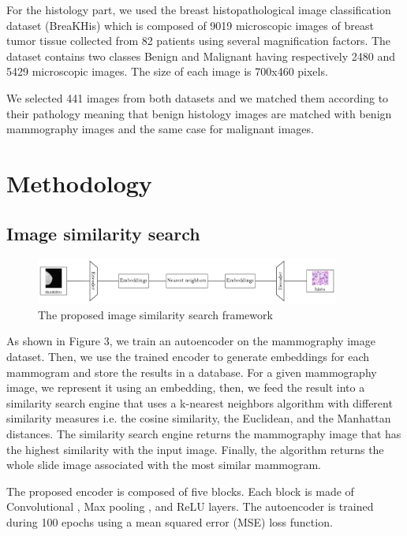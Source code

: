 \documentclass[11pt]{article}
\begin{document}
For the histology part, we used the breast histopathological image classification dataset (BreaKHis) \cite{spanhol2015dataset} which is composed of 9019 microscopic images of breast tumor tissue collected from 82 patients using several magnification factors. The dataset contains two classes Benign and Malignant having respectively 2480 and 5429 microscopic images. The size of each image is 700x460 pixels.

We selected 441 images from both datasets and we matched them according to their pathology meaning that benign histology images are matched with benign mammography images and the same case for malignant images. 
 \section{Methodology}
\subsection{Image similarity search}

\begin{figure}[h!]
  \centering
  \includegraphics[width=10cm]{similarity_search.pdf}

\caption{The proposed image similarity search framework}
\end{figure}



As shown in Figure 3, we train an autoencoder on the mammography image dataset. Then, we use the trained encoder to generate embeddings for each mammogram and store the results in a database. For a given mammography image, we represent it using an embedding, then, we feed the result into a similarity search engine that uses a k-nearest neighbors algorithm with different similarity measures i.e. the cosine similarity, the Euclidean, and the Manhattan distances. The similarity search engine returns the mammography image that has the highest similarity with the input image. Finally, the algorithm returns the whole slide image associated with the most similar mammogram.

The proposed encoder is composed of five blocks. Each block is made of Convolutional \cite{o2015introduction}, Max pooling \cite{graham2014fractional}, and ReLU \cite{arora2016understanding} layers. The autoencoder is trained during 100 epochs using a mean squared error \cite{willmott2005advantages} (MSE) loss function.
\end{document}
